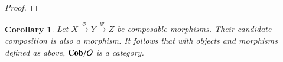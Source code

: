\documentclass{amsart}
\makeatletter
\def\mc{\mathcal}
\def\to{\rightarrow}
\def\ullimit{\ar@{}[rd]|(.3)*+{\lrcorner}}
\def\urlimit{\ar@{}[ld]|(.3)*+{\llcorner}}
\def\lllimit{\ar@{}[ru]|(.3)*+{\urcorner}}
\def\lrlimit{\ar@{}[lu]|(.3)*+{\ulcorner}}
\newcommand{\To}[1]{\xrightarrow{#1}}
\def\Cob{{\bf Cob}}
\def\mcO{\mc{O}}
\newcommand{\inp}[1]{{#1_-}}
\newcommand{\outp}[1]{{#1_+}}
\newcommand{\feeddd}[3]{{\tensor*[^{#2}_{\color{white}{!}}]{{#1}}{^{#3}}}}%
\newcommand{\feedcc}[3]{{\tensor*[^{\color{white}{!}}_{#2}]{{#1}}{_{#3}}}}
\newcommand{\feeddb}[2]{{\tensor*[^{#2}]{{#1}}{}}}
\newcommand{\feedbc}[2]{{\tensor*{{#1}}{^~_{#2}}}}
\newcommand{\feedcb}[2]{{\tensor*[^~_{#2}]{{#1}}{}}}
\newcommand{\feedbd}[2]{{\tensor*{{#1}}{^{#2}}}}
\newtheorem{corollary}[subsection]{Corollary}
\theoremstyle{remark}
\theoremstyle{definition}
\makeatother
\begin{document}
\begin{proof}
%
%
%
\end{proof}

\begin{corollary}

Let $X\To{\Phi}Y\To{\Psi}Z$ be composable morphisms. Their candidate composition is also a morphism. It follows that with objects and morphisms defined as above, $\Cob/\mcO$ is a category.

\end{corollary}
\end{document}
